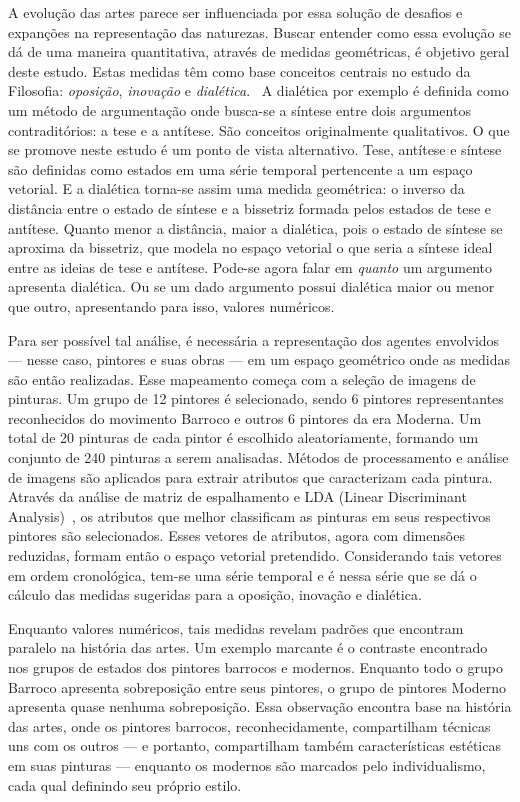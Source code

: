 A evolução das artes parece ser influenciada por essa solução de
desafios e expanções na representação das naturezas. Buscar entender
como essa evolução se dá de uma maneira quantitativa, através de
medidas geométricas, é objetivo geral deste estudo. Estas medidas têm
como base conceitos centrais no estudo da Filosofia:
\textit{oposição}, \textit{inovação} e
\textit{dialética}.~\cite{deleuze,pinto,van} A dialética por exemplo é
definida como um método de argumentação onde busca-se a síntese entre
dois argumentos contraditórios: a tese e a antítese. São conceitos
originalmente qualitativos. O que se promove neste estudo é um ponto
de vista alternativo. Tese, antítese e síntese são definidas como
estados em uma série temporal pertencente a um espaço vetorial. E a
dialética torna-se assim uma medida geométrica: o inverso da distância
entre o estado de síntese e a bissetriz formada pelos estados de tese
e antítese. Quanto menor a distância, maior a dialética, pois o estado
de síntese se aproxima da bissetriz, que modela no espaço vetorial o
que seria a síntese ideal entre as ideias de tese e antítese. Pode-se
agora falar em \emph{quanto} um argumento apresenta dialética. Ou se
um dado argumento possui dialética maior ou menor que outro,
apresentando para isso, valores numéricos.

Para ser possível tal análise, é necessária a representação dos
agentes envolvidos --- nesse caso, pintores e suas obras --- em um
espaço geométrico onde as medidas são então realizadas. Esse
mapeamento começa com a seleção de imagens de pinturas. Um grupo de 12
pintores é selecionado, sendo 6 pintores representantes reconhecidos
do movimento Barroco e outros 6 pintores da era Moderna. Um total de
20 pinturas de cada pintor é escolhido aleatoriamente, formando um
conjunto de 240 pinturas a serem analisadas. Métodos de processamento
e análise de imagens são aplicados para extrair atributos que
caracterizam cada pintura. Através da análise de matriz de
espalhamento e LDA (Linear Discriminant
Analysis)~\cite{luciano,fisher}, os atributos que melhor classificam
as pinturas em seus respectivos pintores são selecionados. Esses
vetores de atributos, agora com dimensões reduzidas, formam então o
espaço vetorial pretendido. Considerando tais vetores em ordem
cronológica, tem-se uma série temporal e é nessa série que se dá o
cálculo das medidas sugeridas para a oposição, inovação e dialética.

Enquanto valores numéricos, tais medidas revelam padrões que encontram paralelo
na história das artes. Um exemplo marcante é o contraste encontrado nos grupos
de estados dos pintores barrocos e modernos. Enquanto todo o grupo Barroco
apresenta sobreposição entre seus pintores, o grupo de pintores Moderno
apresenta quase nenhuma sobreposição. Essa observação encontra base na história
das artes, onde os pintores barrocos, reconhecidamente, compartilham técnicas uns
com os outros --- e portanto, compartilham também características estéticas em
suas pinturas --- enquanto os modernos são marcados pelo individualismo, cada
qual definindo seu próprio estilo.

